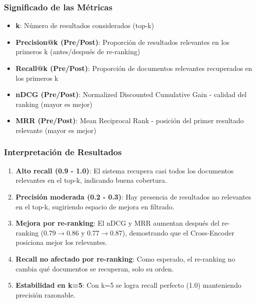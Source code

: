 \documentclass[12pt,a4paper]{article}
\begin{document}
\subsubsection{Significado de las Métricas}

\begin{itemize}
    \item \textbf{k}: Número de resultados considerados (top-k)
    \item \textbf{Precision@k (Pre/Post)}: Proporción de resultados relevantes en los primeros k (antes/después de re-ranking)
    \item \textbf{Recall@k (Pre/Post)}: Proporción de documentos relevantes recuperados en los primeros k
    \item \textbf{nDCG (Pre/Post)}: Normalized Discounted Cumulative Gain - calidad del ranking (mayor es mejor)
    \item \textbf{MRR (Pre/Post)}: Mean Reciprocal Rank - posición del primer resultado relevante (mayor es mejor)
\end{itemize}

\subsubsection{Interpretación de Resultados}

\begin{enumerate}
    \item \textbf{Alto recall (0.9 - 1.0)}: El sistema recupera casi todos los documentos relevantes en el top-k, indicando buena cobertura.
    
    \item \textbf{Precisión moderada (0.2 - 0.3)}: Hay presencia de resultados no relevantes en el top-k, sugiriendo espacio de mejora en filtrado.
    
    \item \textbf{Mejora por re-ranking}: El nDCG y MRR aumentan después del re-ranking (0.79$\rightarrow$0.86 y 0.77$\rightarrow$0.87), demostrando que el Cross-Encoder posiciona mejor los relevantes.
    
    \item \textbf{Recall no afectado por re-ranking}: Como esperado, el re-ranking no cambia qué documentos se recuperan, solo su orden.
    
    \item \textbf{Estabilidad en k=5}: Con k=5 se logra recall perfecto (1.0) manteniendo precisión razonable.
\end{enumerate}
\end{document}
